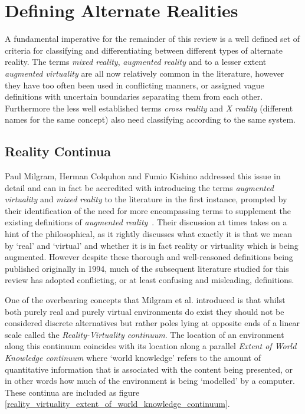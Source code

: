 \section{Defining Alternate Realities}
A fundamental imperative for the remainder of this review is a well defined set of criteria for classifying and differentiating between different types of alternate reality. The terms \textit{mixed reality}, \textit{augmented reality} and to a lesser extent \textit{augmented virtuality} are all now relatively common in the literature, however they have too often been used in conflicting manners, or assigned vague definitions with uncertain boundaries separating them from each other. Furthermore the less well established terms \textit{cross reality} and \textit{X reality} (different names for the same concept) also need classifying according to the same system.

\subsection{Reality Continua}
Paul Milgram, Herman Colquhon and Fumio Kishino addressed this issue in detail and can in fact be accredited with introducing the terms \textit{augmented virtuality} and \textit{mixed reality} to the literature in the first instance, prompted by their identification of the need for more encompassing terms to supplement the existing definitions of \textit{augmented reality}~\cite{Milgram1994, Milgram1999}. Their discussion at times takes on a hint of the philosophical, as it rightly discusses what exactly it is that we mean by `real' and `virtual' and whether it is in fact reality or virtuality which is being augmented. However despite these thorough and well-reasoned definitions being published originally in 1994, much of the subsequent literature studied for this review has adopted conflicting, or at least confusing and misleading, definitions.

One of the overbearing concepts that Milgram et al. introduced is that whilst both purely real and purely virtual environments do exist they should not be considered discrete alternatives but rather poles lying at opposite ends of a linear scale called the \textit{Reality-Virtuality continuum}. The location of an environment along this continuum coincides with its location along a parallel \textit{Extent of World Knowledge continuum} where `world knowledge' refers to the amount of quantitative information that is associated with the content being presented, or in other words how much of the environment is being `modelled' by a computer. These continua are included as figure \ref{reality_virtuality_extent_of_world_knowledge_continuum}.

